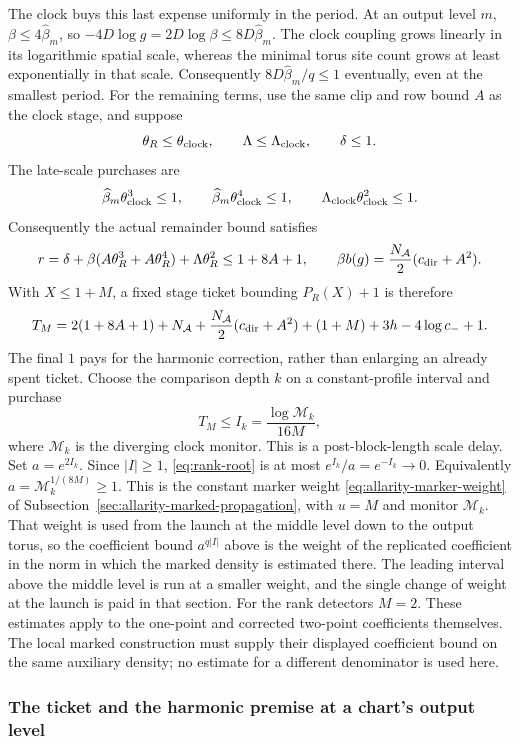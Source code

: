 The clock buys this last expense uniformly in the period. At an output
level $m$, $\beta\le4\widehat\beta_m$, so
$-4D\log g=2D\log\beta\le8D\widehat\beta_m$.
The clock coupling grows linearly in its logarithmic spatial scale,
whereas the minimal torus site count grows at least exponentially in
that scale. Consequently $8D\widehat\beta_m/q\le1$ eventually, even
at the smallest period. For the remaining terms, use the same clip and row bound $A$ as the
clock stage, and suppose
\[
 \theta_R\le\theta_{\rm clock},\qquad
 \Lambda\le\Lambda_{\rm clock},\qquad \delta\le1.
\]
The late-scale purchases are
\[
 \widehat\beta_m\theta_{\rm clock}^{3}\le1,\qquad
 \widehat\beta_m\theta_{\rm clock}^{4}\le1,\qquad
 \Lambda_{\rm clock}\theta_{\rm clock}^{2}\le1.
\]
Consequently the actual remainder bound satisfies
\[
 r=\delta+\beta(A\theta_R^3+A\theta_R^4)
                     +\Lambda\theta_R^2
       \le1+8A+1,
 \qquad
 \beta b(g)=\frac{N_{\mathcal A}}2(c_{\rm dir}+A^2).
\]
With $X\le1+M$, a fixed stage ticket bounding $P_R(X)+1$ is therefore
\[
 T_M=2(1+8A+1)+N_{\mathcal A}
       +\frac{N_{\mathcal A}}2(c_{\rm dir}+A^2)
       +(1+M)+3h-4\log c_-+1.
\]
The final $1$ pays for the harmonic correction, rather than enlarging
an already spent ticket. Choose the comparison depth $k$ on a
constant-profile interval and purchase
\[
 T_M\le I_k=\frac{\log \mathcal M_k}{16M},
\]
where $\mathcal M_k$ is the diverging clock monitor. This is a
post-block-length scale delay. Set $a=e^{2I_k}$. Since $|I|\ge1$,
\eqref{eq:rank-root} is at most $e^{I_k}/a=e^{-I_k}\to0$.
Equivalently $a=\mathcal M_k^{1/(8M)}\ge1$. This is the constant
marker weight \eqref{eq:allarity-marker-weight} of
Subsection~\ref{sec:allarity-marked-propagation}, with $u=M$ and monitor
$\mathcal M_k$. That weight is used from the launch at the middle level
down to the output torus, so the coefficient bound $a^{q|I|}$ above is
the weight of the replicated coefficient in the norm in which the marked
density is estimated there. The leading interval above the middle level
is run at a smaller weight, and the single change of weight at the
launch is paid in that section.
For the rank detectors $M=2$. These estimates apply to the one-point
and corrected two-point coefficients themselves. The local marked
construction must supply their displayed coefficient bound on the
same auxiliary density; no estimate for a different denominator is
used here.

\subsubsection{The ticket and the harmonic premise at a chart's output level}
\label{subsec:rank-root-output-ticket}

